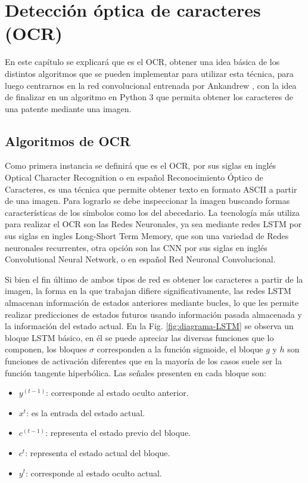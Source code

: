 \chapter{Detección óptica de caracteres (OCR)}

En este capítulo se explicará que es el OCR, obtener una idea básica
de los distintos algoritmos que se pueden implementar para
utilizar esta técnica, para luego centrarnos en la red convolucional entrenada por
Ankandrew \cite{ankandrew_reconocedor_2023}, con la idea de finalizar en un algoritmo en Python 3
que permita obtener los caracteres de una patente mediante una imagen.

\section{Algoritmos de OCR}

Como primera instancia se definirá que es el OCR, por sus siglas en inglés Optical Character
Recognition o en español Reconocimiento Óptico de Caracteres, es una técnica que permite
obtener texto en formato ASCII a partir de una imagen.
Para lograrlo se debe inspeccionar la imagen buscando formas características de los símbolos como los del abecedario.
La tecnología más utiliza para realizar el OCR son las Redes Neuronales, ya sea
mediante redes LSTM por sus siglas en ingles Long-Short Term Memory, que son una variedad de Redes
neuronales recurrentes, otra opción son las CNN por sus siglas en inglés Convolutional Neural Network, o en español Red Neuronal Convolucional.

Si bien el fin último de ambos tipos de red es obtener los caracteres a partir de la imagen, la forma en
la que trabajan difiere significativamente, las redes LSTM almacenan información de estados anteriores mediante bucles,
lo que les permite realizar predicciones de estados futuros usando información pasada almacenada y la información
del estado actual. En la Fig. \ref{fig:diagrama-LSTM} se observa un bloque LSTM básico, en él se puede apreciar las diversas funciones que lo componen, los bloques $\sigma$ corresponden a la función sigmoide, el bloque $g$ y $h$ son funciones de activación diferentes que en la mayoría de los casos suele ser la función tangente hiperbólica.
Las señales presenten en cada bloque son:
\begin{itemize}
    \item $y^{(t-1)}$: corresponde al estado oculto anterior.
    \item $x^t$: es la entrada del estado actual.
    \item $c^{(t-1)}$: representa el estado previo del bloque.
    \item $c^t$: representa el estado actual del bloque.
    \item $y^t$: corresponde al estado oculto actual.
\end{itemize}

